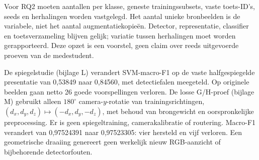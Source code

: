 Voor RQ2 moeten aantallen per klasse, geneste trainingssubsets, vaste toets-ID's, seeds en herhalingen worden vastgelegd. Het aantal unieke bronbeelden is de variabele, niet het aantal augmentatiekopie\"en. Detector, representatie, classifier en toetsverzameling blijven gelijk; variatie tussen herhalingen moet worden gerapporteerd. Deze opzet is een voorstel, geen claim over reeds uitgevoerde proeven van de medestudent.

De spiegelstudie (bijlage L) verandert SVM-macro-F1 op de vaste halfgespiegelde presentatie van 0,53849 naar 0,84560, met detectiefalen meegeteld. Op originele beelden gaan netto 26 goede voorspellingen verloren. De losse G/H-proef (bijlage M) gebruikt alleen $180^\circ$ camera-$y$-rotatie van trainingsrichtingen, $(d_x,d_y,d_z)\mapsto(-d_x,d_y,-d_z)$, met behoud van brongewicht en oorspronkelijke preprocessing. Er is geen spiegeltraining, camerakalibratie of routering. Macro-F1 verandert van 0,97524391 naar 0,97523305: vier hersteld en vijf verloren. Een geometrische draaiing genereert geen werkelijk nieuw RGB-aanzicht of bijbehorende detectorfouten.
